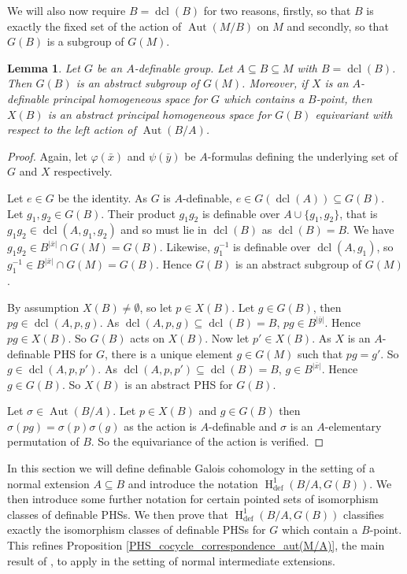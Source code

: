\documentclass{article}
\theoremstyle{problemstyle}
\newtheorem{lemma}[problem]{Lemma}
\DeclareMathOperator{\defin}{def} %
\DeclareMathOperator{\aut}{Aut} %
\DeclareMathOperator{\HH}{H} %
\DeclareMathOperator{\dcl}{dcl} %
\begin{document}
We will also now require $B = \dcl(B)$ for two reasons, firstly, so that $B$ is exactly the fixed set of the action of $\aut(M/B)$ on $M$ and secondly, so that $G(B)$ is a subgroup of $G(M)$.

\begin{lemma}
    Let $G$ be an $A$-definable group. Let $A \subseteq B \subseteq M$ with $B = \dcl(B)$. Then $G(B)$ is an abstract subgroup of $G(M)$. Moreover, if $X$ is an $A$-definable principal homogeneous space for $G$ which contains a $B$-point, then $X(B)$ is an abstract principal homogeneous space for $G(B)$ equivariant with respect to the left action of $\aut(B/A)$. 
\end{lemma}

\begin{proof}
    Again, let $\varphi(\bar{x})$ and $\psi(\bar{y})$ be $A$-formulas defining the underlying set of $G$ and $X$ respectively.
    
    Let $e \in G$ be the identity. As $G$ is $A$-definable, $e \in G(\dcl(A)) \subseteq G(B)$. Let $g_1,g_2 \in G(B)$. Their product $g_1g_2$ is definable over $A\cup \{g_1, g_2\}$, that is $g_1g_2 \in \dcl(A,g_1,g_2)$ and so must lie in $\dcl(B)$ as $\dcl(B) = B$. We have $g_1g_2 \in B^{|\bar{x}|} \cap G(M) = G(B)$. Likewise, $g_1^{-1}$ is definable over $\dcl(A,g_1)$, so $g_1^{-1} \in B^{|\bar{x}|} \cap G(M) = G(B)$. Hence $G(B)$ is an abstract subgroup of $G(M)$.
    
    By assumption $X(B) \neq \emptyset$, so let $p \in X(B)$. 
    Let $g \in G(B)$, then $pg \in \dcl(A,p,g)$. As $\dcl(A,p,g) \subseteq \dcl(B) = B$, $pg \in B^{|\bar{y}|}$. Hence $pg \in X(B)$. So $G(B)$ acts on $X(B)$. Now let $p' \in X(B)$. As $X$ is an $A$-definable PHS for $G$, there is a unique element $g \in G(M)$ such that $pg = g'$. So $g \in \dcl(A,p,p')$. As $\dcl(A,p,p') \subseteq \dcl(B) = B$, $g \in B^{|\bar{x}|}$. Hence $g \in G(B)$. So $X(B)$ is an abstract PHS for $G(B)$. 

    Let $\sigma \in \aut(B/A)$. Let $p \in X(B)$ and $g \in G(B)$ then $\sigma(pg) = \sigma(p)\sigma(g)$ as the action is $A$-definable and $\sigma$ is an $A$-elementary permutation of $B$. So the equivariance of the action is verified.
\end{proof}

In this section we will define definable Galois cohomology in the setting of a normal extension $A \subseteq B$ and introduce the notation $\HH^1_{\defin}(B/A,G(B))$. We then introduce some further notation for certain pointed sets of isomorphism classes of definable PHSs. We then prove that $\HH^1_{\defin}(B/A,G(B))$ classifies exactly the isomorphism classes of definable PHSs for $G$ which contain a $B$-point. This refines Proposition \ref{PHS_cocycle_correspondence_aut(M/A)}, the main result of \cite{pillay_1997}, to apply in the setting of normal intermediate extensions. 
\end{document}
